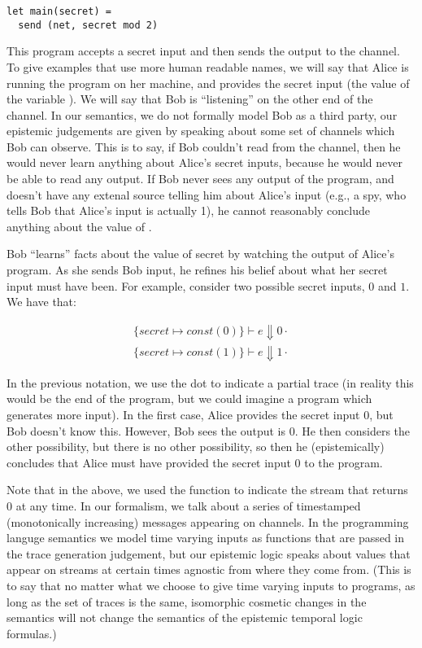 \documentclass[conference]{IEEEtran}
\newcommand{\code}[1]{\text{\lstinline!#1!}}
\theoremstyle{definition}
\newcommand{\aset}[1]{\{#1\}}
\newcommand{\sreduce}{\Downarrow}
\newcommand{\judge}{\vdash}
\begin{document}
\begin{lstlisting}
let main(secret) =
  send (net, secret mod 2)
\end{lstlisting}

This program accepts a secret input and then sends the output to the
\code{net} channel.  To give examples that use more human readable
names, we will say that Alice is running the program on her machine,
and provides the secret input (the value of the variable
\code{secret}).  We will say that Bob is ``listening'' on the other
end of the \code{net} channel.  In our semantics, we do not formally
model Bob as a third party, our epistemic judgements are given by
speaking about some set of channels which Bob can observe.  This is to
say, if Bob couldn't read from the \code{net} channel, then he would
never learn anything about Alice's secret inputs, because he would
never be able to read any output.  If Bob never sees any output of the
program, and doesn't have any extenal source telling him about Alice's
input (e.g., a spy, who tells Bob that Alice's input is actually 1),
he cannot reasonably conclude anything about the value of
\code{secret}.

Bob ``learns'' facts about the value of secret by watching the output
of Alice's program.  As she sends Bob input, he refines his belief
about what her secret input must have been.  For example, consider two
possible secret inputs, $0$ and $1$.  We have that:

\begin{displaymath}
  \begin{array}{c}
    \aset{secret \mapsto const(0)} \judge e \sreduce 0 \cdot \\
    \aset{secret \mapsto const(1)} \judge e \sreduce 1 \cdot
  \end{array}
\end{displaymath}

In the previous notation, we use the dot to indicate a partial trace
(in reality this would be the end of the program, but we could imagine
a program which generates more input).  In the first case, Alice
provides the secret input 0, but Bob doesn't know this.  However, Bob
sees the output is 0.  He then considers the other possibility, but
there is no other possibility, so then he (epistemically) concludes
that Alice must have provided the secret input 0 to the program.

Note that in the above, we used the \code{const} function to indicate
the stream that returns $0$ at any time.  In our formalism, we talk
about a series of timestamped (monotonically increasing) messages
appearing on channels.  In the programming languge semantics we model
time varying inputs as functions that are passed in the trace
generation judgement, but our epistemic logic speaks about values that
appear on streams at certain times agnostic from where they come from.
(This is to say that no matter what we choose to give time varying
inputs to programs, as long as the set of traces is the same,
isomorphic cosmetic changes in the semantics will not change the
semantics of the epistemic temporal logic formulas.)
\end{document}
